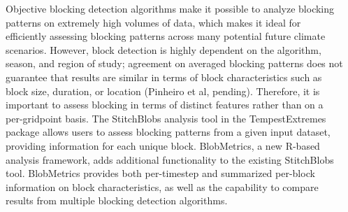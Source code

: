 \documentclass[final]{beamer}
\newlength{\sepwid}
\newlength{\onecolwid}
\newlength{\fourcolwid}
\begin{document}
\begin{frame}[t]
\begin{columns}[t]
\begin{column}{\fourcolwid}
\begin{exampleblock}{}
\small{Objective blocking detection algorithms make it possible to analyze blocking patterns on extremely high volumes of data, which makes it ideal for efficiently assessing blocking patterns across many potential future climate scenarios. However, block detection is highly dependent on the algorithm, season, and region of study; agreement on averaged blocking patterns does not guarantee that results are similar in terms of block characteristics such as block size, duration, or location (Pinheiro et al, pending). Therefore, it is important to assess blocking in terms of distinct features rather than on a per-gridpoint basis. The StitchBlobs analysis tool in the TempestExtremes package allows users to assess blocking patterns from a given input dataset, providing information for each unique block. BlobMetrics, a new R-based analysis framework, adds additional functionality to the existing StitchBlobs tool. BlobMetrics provides both per-timestep and summarized per-block information on block characteristics, as well as the capability to compare results from multiple blocking detection algorithms. }
\end{exampleblock}
\end{column}
\begin{column}{\sepwid}\end{column} %
\end{columns}
\begin{columns}[t]
\begin{column}{\sepwid}\end{column} %
\begin{column}{\onecolwid} %




\end{column}
\end{columns}
\end{frame}
\end{document}
